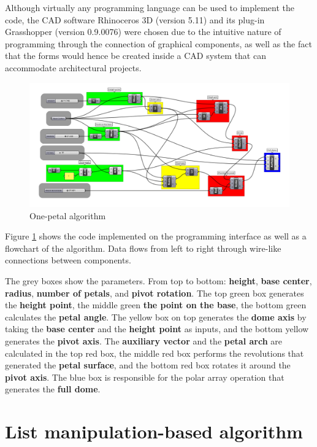 \documentclass[preprint,12pt,3p]{elsarticle}
\begin{document}
Although virtually any programming language can be used to implement the code, the CAD software Rhinoceros 3D (version 5.11) and its plug-in Grasshopper (version 0.9.0076) were chosen due to the intuitive nature of programming through the connection of graphical components, as well as the fact that the forms would hence be created inside a CAD system that can accommodate architectural projects.

\begin{figure}[!h]
\begin{center}
\includegraphics[width=0.95
\textwidth]{alg01.png}
\caption{One-petal algorithm}
\label{figura:alg01}
\end{center}
\end{figure}

Figure \ref{figura:alg01} shows the code implemented on the programming interface as well as a flowchart of the algorithm. Data flows from left to right through wire-like connections between components.

The grey boxes show the parameters. From top to bottom: \textbf{height}, \textbf{base center}, \textbf{radius}, \textbf{number of petals}, and \textbf{pivot rotation}. The top green box generates the \textbf{height point}, the middle green \textbf{the point on the base}, the bottom green calculates the \textbf{petal angle}. The yellow box on top generates the \textbf{dome axis} by taking the \textbf{base center} and the \textbf{height point} as inputs, and the bottom yellow generates the \textbf{pivot axis}. The \textbf{auxiliary vector} and the \textbf{petal arch} are calculated in the top red box, the middle red box performs the revolutions that generated the \textbf{petal surface}, and the bottom red box rotates it around the \textbf{pivot axis}. The blue box is responsible for the polar array operation that generates the \textbf{full dome}.



\section{List manipulation-based algorithm}
\label{listmanip}
\end{document}
